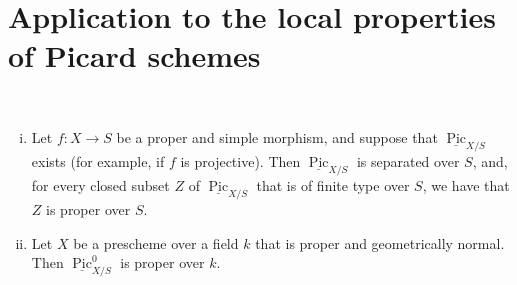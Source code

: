 \section{Application to the local properties of Picard schemes}\label{fga3.vi-2}

\begin{theorem}\label{fga3.vi-2-theorem-2.1}
    ~
    \begin{enumerate}[i.]
        \item Let $f\colon X\to S$ be a proper and simple morphism, and suppose that $\underline{\operatorname{Pic}}_{X/S}$ exists (for example, if $f$ is projective).
              Then $\underline{\operatorname{Pic}}_{X/S}$ is separated over $S$, and, for every closed subset $Z$ of $\underline{\operatorname{Pic}}_{X/S}$ that is of finite type over $S$, we have that $Z$ is proper over $S$.
        \item Let $X$ be a prescheme over a field $k$ that is proper and geometrically normal.
              Then $\underline{\operatorname{Pic}}_{X/S}^0$ is proper over $k$.
    \end{enumerate}
\end{theorem}


